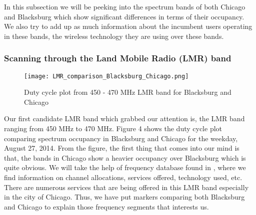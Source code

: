 \documentclass[12pt,sts]{report}
\begin{document}
	In this subsection we will be peeking into the spectrum bands of both Chicago and Blacksburg which show significant differences in terms of their occupancy. We also try to add up as much information about the incumbent users operating in these bands, the wireless technology they are using over these bands.
	
		\subsubsection{Scanning through the Land Mobile Radio (LMR) band}
		
		\begin{figure}[ht!]
			\centering
				\texttt{[image: LMR\_comparison\_Blacksburg\_Chicago.png]}
			\caption{Duty cycle plot from 450 - 470 MHz LMR band for Blacksburg and Chicago}
		\end{figure}
		
		Our first candidate LMR band which grabbed our attention is, the LMR band ranging from 450 MHz to 470 MHz. Figure 4 shows the duty cycle plot comparing spectrum occupancy in Blacksburg and Chicago for the weekday, August 27, 2014. From the figure, the first thing that comes into our mind is that, the bands in Chicago show a heavier occupancy over Blacksburg which is quite obvious. We will take the help of frequency database found in \cite{chicago_spec_occ} \cite{blacksburg_spec_occ}, where we find information on channel allocations, services offered, technology used, etc. There are numerous services that are being offered in this LMR band especially in the city of Chicago. Thus, we have put markers comparing both Blacksburg and Chicago to explain those frequency segments that interests us.
		
\end{document}
